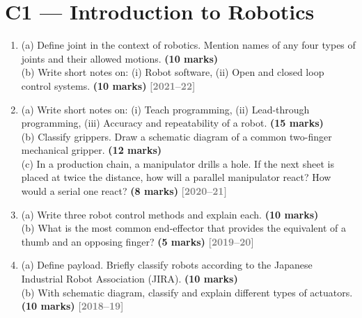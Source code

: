 \documentclass[12pt,a3paper]{article}
\newcommand{\yr}[1]{\hfill\textcolor{gray}{\small\textbf{[#1]}}}
\newcommand{\mk}[1]{\textcolor{orange!70!black}{\small\textbf{(#1 marks)}}}
\begin{document}
\section{C1 --- Introduction to Robotics}

\begin{enumerate}
\item \label{qlabel:C1-Q2}
(a) Define joint in the context of robotics. Mention names of any four types of joints and their allowed motions. \mk{10}\\
(b) Write short notes on: (i) Robot software, (ii) Open and closed loop control systems. \mk{10}
\yr{2021--22}




\item \label{qlabel:C1-Q1}
(a) Write short notes on: (i) Teach programming, (ii) Lead-through programming, (iii) Accuracy and repeatability of a robot. \mk{15}\\
(b) Classify grippers. Draw a schematic diagram of a common two-finger mechanical gripper. \mk{12}\\
(c) In a production chain, a manipulator drills a hole. If the next sheet is placed at twice the distance, how will a parallel manipulator react? How would a serial one react? \mk{8}
\yr{2020--21}




\item \label{qlabel:C1-Q3}
(a) Write three robot control methods and explain each. \mk{10}\\
(b) What is the most common end-effector that provides the equivalent of a thumb and an opposing finger? \mk{5}
\yr{2019--20}




\item \label{qlabel:C1-Q6}
(a) Define payload. Briefly classify robots according to the Japanese Industrial Robot Association (JIRA). \mk{10}\\
(b) With schematic diagram, classify and explain different types of actuators. \mk{10}
\yr{2018--19}





\end{enumerate}
\end{document}

